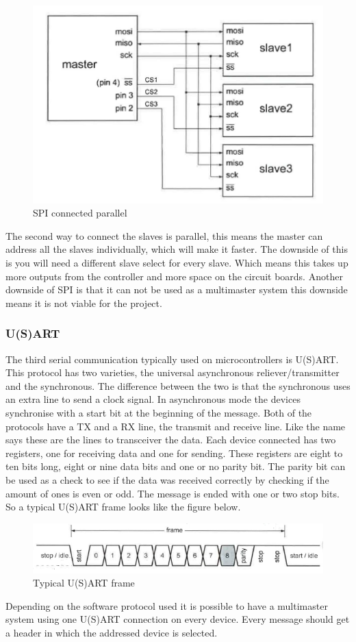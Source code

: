 \documentclass[10pt,a4paper]{article}
\begin{document}
\begin{figure}[H]
        \centering
        \graphicspath{ {./images/} }
        \includegraphics[scale=.4]{SPIparallel}
        \caption{SPI connected parallel}
        \label{fig:SPIparallel}
\end{figure}
The second way to connect the slaves is parallel, this means the master can address all the slaves individually, which will make it faster. The downside of this is you will need a different slave select for every slave. Which means this takes up more outputs from the controller and more space on the circuit boards.
Another downside of SPI is that it can not be used as a multimaster system this downside means it is not viable for the project.
\subsubsection{U(S)ART}
The third serial communication typically used on microcontrollers is U(S)ART. This protocol has two varieties, the universal asynchronous reliever/transmitter and the synchronous. The difference between the two is that the synchronous uses an extra line to send a clock signal. In asynchronous mode the devices synchronise with a start bit at the beginning of the message.
Both of the protocols have a TX and a RX line, the transmit and receive line. Like the name says these are the lines to transceiver the data. Each device connected has two registers, one for receiving data and one for sending. These registers are eight to ten bits long, eight or nine data bits and one or no parity bit. The parity bit can be used as a check to see if the data was received correctly by checking if the amount of ones is even or odd. The message is ended with one or two stop bits. So a typical U(S)ART frame looks like the figure below.
\begin{figure}[H]
        \centering
        \graphicspath{ {./images/} }
        \includegraphics[scale=.4]{UARTframe}
        \caption{Typical U(S)ART frame}
        \label{fig:UARTframe}
\end{figure}
Depending on the software protocol used it is possible to have a multimaster system using one U(S)ART connection on every device. Every message should get a header in which the addressed device is selected.
\end{document}
